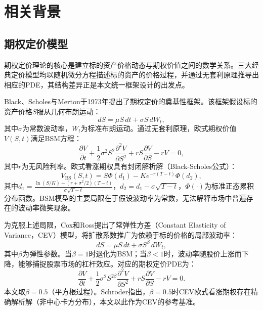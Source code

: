 \chapter{相关背景}\label{chap:related}

\section{期权定价模型}\label{sec:option_models}

期权定价理论的核心是建立标的资产价格动态与期权价值之间的数学关系。三大经典定价模型均以随机微分方程描述标的资产的价格过程，并通过无套利原理推导出相应的PDE，其结构差异正是本文统一框架设计的出发点。

Black、Scholes与Merton于1973年提出了期权定价的奠基性框架\cite{black1973pricing,merton1973theory}。该框架假设标的资产价格$S$服从几何布朗运动：
\begin{equation}
  dS = \mu S\,dt + \sigma S\,dW_t,
\end{equation}
其中$\sigma$为常数波动率，$W_t$为标准布朗运动。通过无套利原理，欧式期权价值$V(S,t)$满足BSM方程：
\begin{equation}\label{eq:bsm}
  \frac{\partial V}{\partial t}
  + \frac{1}{2}\sigma^2 S^2 \frac{\partial^2 V}{\partial S^2}
  + rS\frac{\partial V}{\partial S}
  - rV = 0,
\end{equation}
其中$r$为无风险利率。欧式看涨期权具有封闭解析解（Black-Scholes公式）：
\begin{equation}\label{eq:bs_formula}
  V_\text{BS}(S,t) = S\Phi(d_1) - Ke^{-r(T-t)}\Phi(d_2),
\end{equation}
其中$d_1 = \frac{\ln(S/K)+(r+\sigma^2/2)(T-t)}{\sigma\sqrt{T-t}}$，$d_2=d_1-\sigma\sqrt{T-t}$，$\Phi(\cdot)$为标准正态累积分布函数。BSM模型的主要局限在于假设波动率为常数，无法解释市场中普遍存在的波动率微笑现象。

为克服上述局限，Cox和Ross\cite{cox1976valuation}提出了常弹性方差（Constant Elasticity of Variance，CEV）模型，将扩散系数推广为依赖于标的价格的局部波动率：
\begin{equation}
  dS = \mu S\,dt + \sigma S^{\beta}\,dW_t,
\end{equation}
其中$\beta$为弹性参数。当$\beta=1$时退化为BSM；当$\beta<1$时，波动率随股价上涨而下降，能够捕捉股票市场的杠杆效应。对应的期权定价PDE为：
\begin{equation}\label{eq:cev}
  \frac{\partial V}{\partial t}
  + \frac{1}{2}\sigma^2 S^{2\beta} \frac{\partial^2 V}{\partial S^2}
  + rS\frac{\partial V}{\partial S}
  - rV = 0.
\end{equation}
本文取$\beta=0.5$（平方根过程）。Schroder\cite{schroder1989computing}指出，$\beta=0.5$时CEV欧式看涨期权存在精确解析解（非中心卡方分布），本文以此作为CEV的参考基准。

